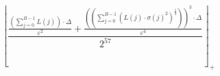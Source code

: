 \[\left\lfloor \frac{\frac{\left(\sum_{j=0}^{B-1} L\left(j\right)\right) \cdot \Delta}{\varepsilon^{2}} + \frac{\left(\left(\sum_{j=0}^{B-1} \left(L\left(j\right) \cdot \sigma\left(j\right)^{2}\right)^{\frac{1}{3}}\right)\right)^{3} \cdot \Delta}{\varepsilon^{4}}}{2^{57}} \right\rfloor_{+}\]
